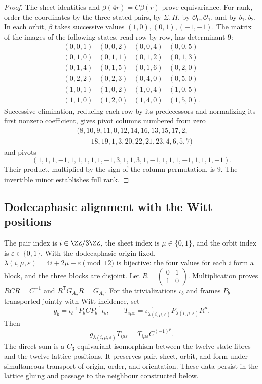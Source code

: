\begin{proof}
The sheet identities and \(\beta(4r)=C\beta(r)\) prove
equivariance. For rank, order the coordinates by the three
stated pairs, by \(\Sigma,\Pi\), by \(\mathcal O_0,\mathcal O_1\),
and by \(b_1,b_2\). In each orbit, \(\beta\) takes successive values
\((1,0),(0,1),(-1,-1)\). The matrix of the images of the following states,
read row by row, has determinant \(9\):
\[
\begin{array}{rrrr}
(0,0,1)&(0,0,2)&(0,0,4)&(0,0,5)\\
(0,1,0)&(0,1,1)&(0,1,2)&(0,1,3)\\
(0,1,4)&(0,1,5)&(0,1,6)&(0,2,0)\\
(0,2,2)&(0,2,3)&(0,4,0)&(0,5,0)\\
(1,0,1)&(1,0,2)&(1,0,4)&(1,0,5)\\
(1,1,0)&(1,2,0)&(1,4,0)&(1,5,0).
\end{array}
\]
Successive elimination, reducing each row by its predecessors and
normalizing its first nonzero coefficient, gives pivot columns
numbered from zero
\[
\begin{split}
&(8,10,9,11,0,12,14,16,13,15,17,2,\\
&\hspace{2em}18,19,1,3,20,22,21,23,4,6,5,7)
\end{split}
\]
and pivots
\[
(1,1,1,-1,1,1,1,1,1,-1,3,1,1,3,1,-1,1,1,1,-1,1,1,1,-1).
\]
Their product, multiplied by the sign of the column permutation,
is \(9\). The invertible minor establishes full rank.
\end{proof}

\subsection{Dodecaphasic alignment with the Witt positions}
\label{x_reciprocidad:nuclear:alineamiento-witt}
The pair index is \(i\in\ZZ/3\ZZ\), the sheet index is
\(\mu\in\{0,1\}\), and the orbit index is \(\varepsilon\in\{0,1\}\).
With the dodecaphasic origin fixed, \(\lambda(i,\mu,\varepsilon)
=4i+2\mu+\varepsilon\pmod{12}\) is bijective: the four values
for each \(i\) form a block, and the three blocks are disjoint.
Let \(R=\left(\begin{smallmatrix}0&1\\1&0\end{smallmatrix}\right)\).
Multiplication proves \(RCR=C^{-1}\) and
\(R^{\mathsf T}G_{A_2}R=G_{A_2}\). For the trivializations
\(\iota_b\) and frames \(P_b\) transported jointly with
Witt incidence, set
\[
g_b=\iota_b^{-1}P_bCP_b^{-1}\iota_b,\qquad
T_{i\mu\varepsilon}=\iota_{\lambda(i,\mu,\varepsilon)}^{-1}
P_{\lambda(i,\mu,\varepsilon)}R^\mu.
\]
Then
\[
g_{\lambda(i,\mu,\varepsilon)}T_{i\mu\varepsilon}
=T_{i\mu\varepsilon}C^{(-1)^\mu}.
\]
The direct sum is a \(C_3\)-equivariant isomorphism between the twelve
state fibres and the twelve lattice positions. It preserves pair,
sheet, orbit, and form under simultaneous transport of origin,
order, and orientation. These data persist in the lattice gluing
and passage to the neighbour constructed below.

